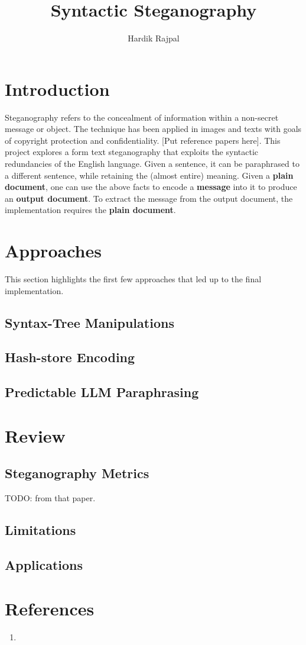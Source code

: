\documentclass{article}
\author{Hardik Rajpal}
\title{Syntactic Steganography}
\begin{document}
\maketitle
\section{Introduction}
Steganography refers to the concealment of information within a non-secret message or object. The technique has been applied in images and texts with goals of copyright protection and confidentiality. [Put reference papers here]. This project explores a form text steganography that exploits the syntactic redundancies of the English language. Given a sentence, it can be
paraphrased to a different sentence, while retaining the (almost entire) meaning. Given a \textbf{plain document}, one can use the above facts to encode a \textbf{message} into it to produce an \textbf{output document}. To extract the message from the output document, the implementation requires the \textbf{plain document}.
\section{Approaches}
This section highlights the first few approaches that led up to the final implementation.
\subsection{Syntax-Tree Manipulations}
\subsection{Hash-store Encoding}
\subsection{Predictable LLM Paraphrasing}
\section{Review}
\subsection{Steganography Metrics}
TODO: from that paper.
\subsection{Limitations}
\subsection{Applications}
\section{References}
\begin{enumerate}
\item 
\end{enumerate}
\end{document}
